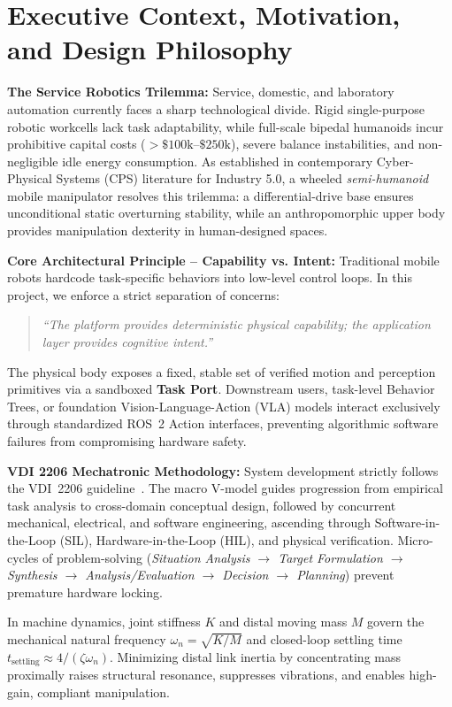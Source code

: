 \documentclass[10pt,a4paper]{article}
\begin{document}
\section{Executive Context, Motivation, and Design Philosophy}
\label{sec:intro}
\vspace{-0.2em}
\textbf{The Service Robotics Trilemma:} Service, domestic, and laboratory automation currently faces a sharp technological divide. Rigid single-purpose robotic workcells lack task adaptability, while full-scale bipedal humanoids incur prohibitive capital costs ($>\$100\text{k}\text{--}\$250\text{k}$), severe balance instabilities, and non-negligible idle energy consumption. As established in contemporary Cyber-Physical Systems (CPS) literature for Industry 5.0, a wheeled \emph{semi-humanoid} mobile manipulator resolves this trilemma: a differential-drive base ensures unconditional static overturning stability, while an anthropomorphic upper body provides manipulation dexterity in human-designed spaces.

\textbf{Core Architectural Principle -- Capability vs. Intent:} Traditional mobile robots hardcode task-specific behaviors into low-level control loops. In this project, we enforce a strict separation of concerns:
\begin{quote}
\centering\footnotesize\itshape
``The platform provides deterministic physical capability; the application layer provides cognitive intent.''
\end{quote}
The physical body exposes a fixed, stable set of verified motion and perception primitives via a sandboxed \textbf{Task Port}. Downstream users, task-level Behavior Trees, or foundation Vision-Language-Action (VLA) models interact exclusively through standardized ROS~2 Action interfaces, preventing algorithmic software failures from compromising hardware safety.

\textbf{VDI 2206 Mechatronic Methodology:} System development strictly follows the VDI~2206 guideline~\cite{vdi2206}. The macro V-model guides progression from empirical task analysis to cross-domain conceptual design, followed by concurrent mechanical, electrical, and software engineering, ascending through Software-in-the-Loop (SIL), Hardware-in-the-Loop (HIL), and physical verification. Micro-cycles of problem-solving (\emph{Situation Analysis $\to$ Target Formulation $\to$ Synthesis $\to$ Analysis/Evaluation $\to$ Decision $\to$ Planning}) prevent premature hardware locking. 

In machine dynamics, joint stiffness $K$ and distal moving mass $M$ govern the mechanical natural frequency $\omega_n = \sqrt{K/M}$ and closed-loop settling time $t_{\text{settling}} \approx 4 / (\zeta \omega_n)$. Minimizing distal link inertia by concentrating mass proximally raises structural resonance, suppresses vibrations, and enables high-gain, compliant manipulation.
\end{document}
